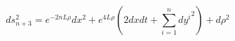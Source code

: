 \begin{equation}
\label{kaigo}
ds^2_{n+3} = e^{-2nL\rho}dx^2+e^{4L\rho}(2dxdt+\sum_{i=1}^n{dy^i}^2)+d\rho^2
\end{equation}


